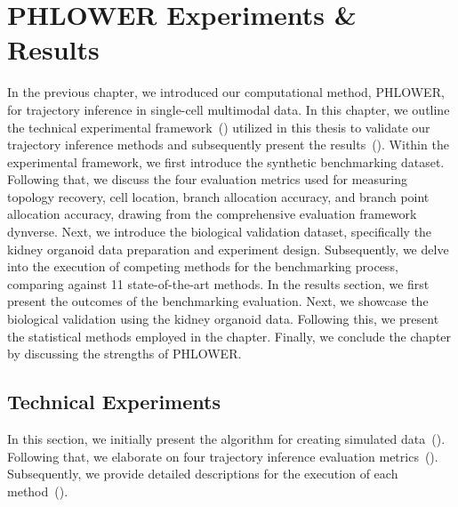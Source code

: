\chapter{PHLOWER Experiments \& Results}
\label{chapter:PHLOWER_bench}
\graphicspath{{chapter6/figs}}


In the previous chapter, we introduced our computational method, PHLOWER, for trajectory inference in single-cell multimodal data. In this chapter, we outline the technical experimental framework~() utilized in this thesis to validate our trajectory inference methods and subsequently present the results~(). Within the experimental framework, we first introduce the synthetic benchmarking dataset. Following that, we discuss the four evaluation metrics used for measuring topology recovery, cell location, branch allocation accuracy, and branch point allocation accuracy, drawing from the comprehensive evaluation framework dynverse. Next, we introduce the biological validation dataset, specifically the kidney organoid data preparation and experiment design. Subsequently, we delve into the execution of competing methods for the benchmarking process, comparing against 11 state-of-the-art methods. In the results section, we first present the outcomes of the benchmarking evaluation. Next, we showcase the biological validation using the kidney organoid data. Following this, we present the statistical methods employed in the chapter. Finally, we conclude the chapter by discussing the strengths of PHLOWER.





\section{Technical Experiments}
\label{chapter:PHLOWER_bench:tech_exp}
In this section, we initially present the algorithm for creating simulated data~(). Following that, we elaborate on four trajectory inference evaluation metrics~(). Subsequently, we provide detailed descriptions for the execution of each method~().

